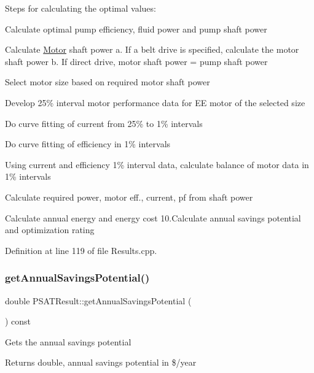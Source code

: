 Steps for calculating the optimal values\+:
\begin{DoxyEnumerate}
\item Calculate optimal pump efficiency, fluid power and pump shaft power
\item Calculate \hyperlink{struct_motor}{Motor} shaft power a. If a belt drive is specified, calculate the motor shaft power b. If direct drive, motor shaft power = pump shaft power
\item Select motor size based on required motor shaft power
\item Develop 25\% interval motor performance data for EE motor of the selected size
\item Do curve fitting of current from 25\% to 1\% intervals
\item Do curve fitting of efficiency in 1\% intervals
\item Using current and efficiency 1\% interval data, calculate balance of motor data in 1\% intervals
\item Calculate required power, motor eff., current, pf from shaft power
\item Calculate annual energy and energy cost 10.\+Calculate annual savings potential and optimization rating
\end{DoxyEnumerate}

Definition at line 119 of file Results.\+cpp.

\mbox{\label{class_p_s_a_t_result_a14fc75c2e0e92f74e3df1b97ed13b496}} 
\subsubsection{\texorpdfstring{get\+Annual\+Savings\+Potential()}{getAnnualSavingsPotential()}}
{\footnotesize\ttfamily double P\+S\+A\+T\+Result\+::get\+Annual\+Savings\+Potential (\begin{DoxyParamCaption}{ }\end{DoxyParamCaption}) const\hspace{0.3cm}{\ttfamily [inline]}}

Gets the annual savings potential \begin{DoxyReturn}{Returns}
double, annual savings potential in \$/year 
\end{DoxyReturn}


